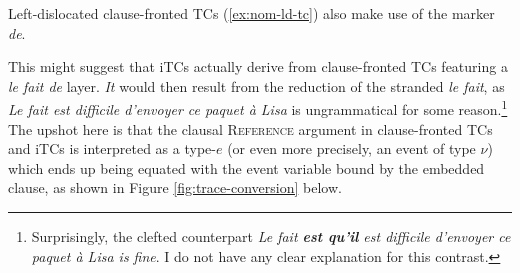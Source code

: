 \documentclass[11pt]{article}
\begin{document}
	\begin{exe}
		\ex
		\begin{xlist}
			\label{ex:nom-it-tc}
			\label{ex:a-fronted-tc}
		\end{xlist}
	\end{exe}
	 Left-dislocated clause-fronted TCs (\ref{ex:nom-ld-tc}) also make use of the marker \textit{de}.
	\begin{exe}
		\label{ex:nom-ld-tc}
	\end{exe}
	 This might suggest that iTCs actually derive from  clause-fronted TCs featuring a \textit{le fait de} layer. \textit{It} would then result from the reduction of the stranded \textit{le fait}, as \textit{Le fait est difficile d'envoyer ce paquet à Lisa} is ungrammatical for some reason.\footnote{Surprisingly, the clefted counterpart \textit{Le fait \textbf{est qu'il} est difficile d'envoyer ce paquet à Lisa is fine}. I do not have any clear explanation for this contrast.}
	 The upshot here is that the clausal \textsc{Reference} argument in clause-fronted TCs and iTCs is interpreted as a type-$e$ (or even more precisely, an event of type $\nu$) which ends up being equated with the event variable bound by the embedded clause, as shown in Figure \ref{fig:trace-conversion} below.
\end{document}
